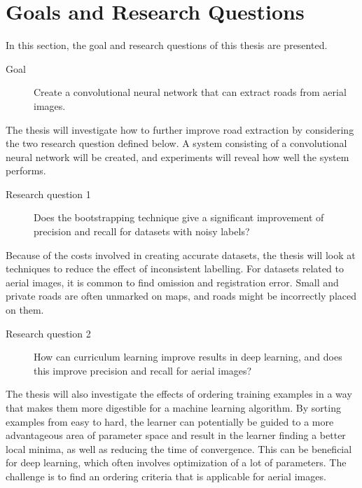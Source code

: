 \section{Goals and Research Questions}
\label{sec:Goals and Research Questions}
In this section, the goal and research questions of this thesis are presented.

\begin{description}
\item[Goal] Create a convolutional neural network that can extract roads from aerial images.
\end{description}

The thesis will investigate how to further improve road extraction by considering the two research question defined below. A system consisting of a convolutional neural network will be created, and experiments will reveal how well the system performs.

\begin{description}
\item[Research question 1] Does the bootstrapping technique give a significant improvement of precision and recall for datasets with noisy labels?
\end{description}

Because of the costs involved in creating accurate datasets, the thesis will look at techniques to reduce the effect of inconsistent labelling. For datasets related to aerial images, it is common to find omission and registration error. Small and private roads are often unmarked on maps, and roads might be incorrectly placed on them.


\begin{description}
\item[Research question 2]  How can curriculum learning improve results in deep learning, and does this improve precision and recall for aerial images?
\end{description}

The thesis will also investigate the effects of ordering training examples in a way that makes them more digestible for a machine learning algorithm. By sorting examples from easy to hard, the learner can potentially be guided to a more advantageous area of parameter space and result in the learner finding a better local minima, as well as reducing the time of convergence. This can be beneficial for deep learning, which often involves optimization of a lot of parameters. The challenge is to find an ordering criteria that is applicable for aerial images. 
